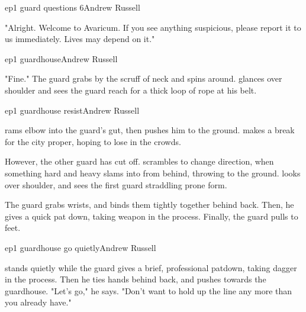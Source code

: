 \documentclass{book}
\begin{document}
\begin{childnode}{ep1 guard questions 6}{Andrew Russell}

    "Alright. Welcome to Avaricum. If you see anything suspicious, please report it to us immediately. Lives may depend on it."

\end{childnode}

\begin{childnode}{ep1 guardhouse}{Andrew Russell}

    

    "Fine." The guard grabs \name{} by the scruff of \hisher{} neck and spins \himher{} around. \name{} glances over \hisher{} shoulder and sees the guard reach for a thick loop of rope at his belt.



\end{childnode}

\begin{childnode}{ep1 guardhouse resist}{Andrew Russell}

    \name{} rams \hisher{} elbow into the guard's gut, then pushes him to the ground. \HeShe{} makes a break for the city proper, hoping to lose \himselfherself{} in the crowds.

However, the other guard has cut \himher{} off.  \name{} scrambles to change direction, when something hard and heavy slams into \himher{} from behind, throwing \himher{} to the ground. \HeShe{} looks over \hisher{} shoulder, and sees the first guard 
straddling \hisher{} prone form.

The guard grabs \names{} wrists, and binds them tightly together behind \hisher{} back.
    Then, he gives \name{} a quick pat down, taking \hisher{} weapon in the process. Finally, the guard pulls \himher{} to \hisher{} feet.


\end{childnode}

\begin{childnode}{ep1 guardhouse go quietly}{Andrew Russell}

\name{} stands quietly while the guard gives \himher{} a brief, professional patdown, taking \hisher{} dagger in the process. Then he ties \names{} hands behind \hisher{} back, and pushes \himher{} towards the guardhouse.
    "Let's go," he says. "Don't want to hold up the line any more than you already have." 


\end{childnode}
\end{document}
